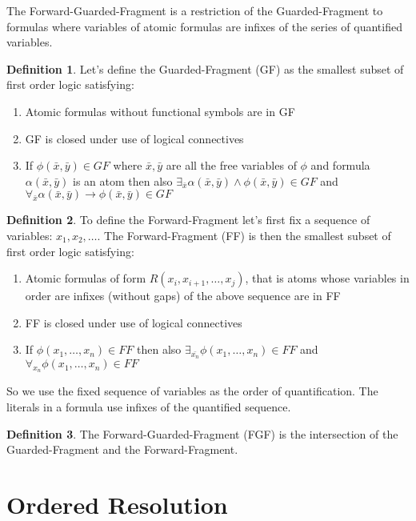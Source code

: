 \documentclass[english, shortabstract]{iithesis}
\theoremstyle{definition} \newtheorem{definition}{Definition}[chapter]
\theoremstyle{remark} \newtheorem{remark}[definition]{Observation}
\theoremstyle{plain} \newtheorem{theorem}[definition]{Theorem}
\theoremstyle{plain} \newtheorem{lemma}[definition]{Lemma}
\begin{document}
The Forward-Guarded-Fragment is a restriction of the Guarded-Fragment to formulas where variables of atomic formulas are infixes of the series of quantified variables. 
\begin{definition}
Let's define the Guarded-Fragment (GF) as the smallest subset of first order logic satisfying:
\begin{enumerate}
    \item Atomic formulas without functional symbols are in GF
    \item GF is closed under use of logical connectives
    \item If $\phi(\bar{x}, \bar{y}) \in GF$ where $\bar{x}, \bar{y}$ are all the free variables of $\phi$ and formula $\alpha(\bar{x},\bar{y})$ is an atom
then also $\exists_{\bar{x}} \alpha(\bar{x}, \bar{y}) \land \phi(\bar{x}, \bar{y}) \in GF$ and $\forall_{\bar{x}} \alpha(\bar{x}, \bar{y}) \rightarrow \phi(\bar{x}, \bar{y}) \in GF$
\end{enumerate}
\end{definition}
\begin{definition}
To define the Forward-Fragment let's first fix a sequence of variables: $x_1, x_2, \dots$. The Forward-Fragment (FF) is then the smallest subset of first order logic satisfying:
\begin{enumerate}
    \item Atomic formulas of form $R(x_i, x_{i+1},\dots,x_{j})$, that is atoms whose variables in order are infixes (without gaps) of the above sequence are in FF
    \item FF is closed under use of logical connectives
    \item If $\phi(x_1,\dots, x_{n}) \in FF$ then also $\exists_{\bar{x_{n}}} \phi(x_1,\dots, x_{n}) \in FF$ and $\forall_{x_n} \phi(x_1,\dots, x_{n}) \in FF$
\end{enumerate}
\end{definition}
So we use the fixed sequence of variables as the order of quantification. The literals in a formula use infixes of the quantified sequence.
\begin{definition}
The Forward-Guarded-Fragment (FGF) is the intersection of the Guarded-Fragment and the Forward-Fragment.
\end{definition}

\chapter{Ordered Resolution}
\end{document}
